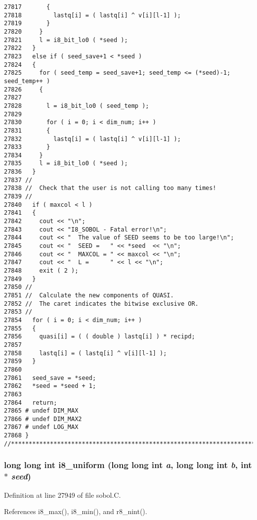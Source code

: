 \begin{Code}
\begin{verbatim}
27817       {
27818         lastq[i] = ( lastq[i] ^ v[i][l-1] );
27819       }
27820     }
27821     l = i8_bit_lo0 ( *seed );
27822   }
27823   else if ( seed_save+1 < *seed )
27824   {
27825     for ( seed_temp = seed_save+1; seed_temp <= (*seed)-1; seed_temp++ )
27826     {
27827 
27828       l = i8_bit_lo0 ( seed_temp );
27829 
27830       for ( i = 0; i < dim_num; i++ )
27831       {
27832         lastq[i] = ( lastq[i] ^ v[i][l-1] );
27833       }
27834     }
27835     l = i8_bit_lo0 ( *seed );
27836   }
27837 //
27838 //  Check that the user is not calling too many times!
27839 //
27840   if ( maxcol < l )
27841   {
27842     cout << "\n";
27843     cout << "I8_SOBOL - Fatal error!\n";
27844     cout << "  The value of SEED seems to be too large!\n";
27845     cout << "  SEED =   " << *seed  << "\n";
27846     cout << "  MAXCOL = " << maxcol << "\n";
27847     cout << "  L =      " << l << "\n";
27848     exit ( 2 );
27849   }
27850 //
27851 //  Calculate the new components of QUASI.
27852 //  The caret indicates the bitwise exclusive OR.
27853 //
27854   for ( i = 0; i < dim_num; i++ )
27855   {
27856     quasi[i] = ( ( double ) lastq[i] ) * recipd;
27857 
27858     lastq[i] = ( lastq[i] ^ v[i][l-1] );
27859   }
27860 
27861   seed_save = *seed;
27862   *seed = *seed + 1;
27863 
27864   return;
27865 # undef DIM_MAX
27866 # undef DIM_MAX2
27867 # undef LOG_MAX
27868 }
//****************************************************************************80
\end{verbatim}
\end{Code}


\subsubsection{\setlength{\rightskip}{0pt plus 5cm}long long int i8\_\-uniform (long long int {\em a}, long long int {\em b}, int $\ast$ {\em seed})}\label{sobol_8C_47d7930d7233254f5504d2b226562df5}




Definition at line 27949 of file sobol.C.

References i8\_\-max(), i8\_\-min(), and r8\_\-nint().

